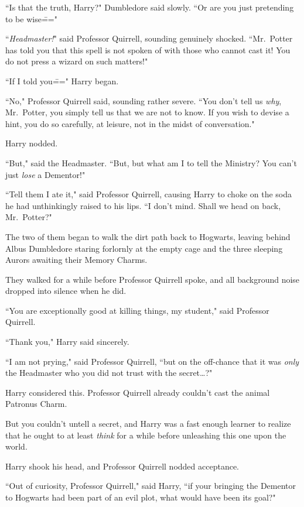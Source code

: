 ``Is that the truth, Harry?" Dumbledore said slowly. ``Or are you just pretending to be wise\==="

``\emph{Headmaster!}" said Professor Quirrell, sounding genuinely shocked. ``Mr.~Potter has told you that this spell is not spoken of with those who cannot cast it! You do not press a wizard on such matters!"

``If I told you\===" Harry began.

``No," Professor Quirrell said, sounding rather severe. ``You don't tell us \emph{why}, Mr.~Potter, you simply tell us that we are not to know. If you wish to devise a hint, you do so carefully, at leisure, not in the midst of conversation."

Harry nodded.

``But," said the Headmaster. ``But, but what am I to tell the Ministry? You can't just \emph{lose} a Dementor!"

``Tell them I ate it," said Professor Quirrell, causing Harry to choke on the soda he had unthinkingly raised to his lips. ``I don't mind. Shall we head on back, Mr.~Potter?"

The two of them began to walk the dirt path back to Hogwarts, leaving behind Albus Dumbledore staring forlornly at the empty cage and the three sleeping Aurors awaiting their Memory Charms.


They walked for a while before Professor Quirrell spoke, and all background noise dropped into silence when he did.

``You are exceptionally good at killing things, my student," said Professor Quirrell.

``Thank you," Harry said sincerely.

``I am not prying," said Professor Quirrell, ``but on the off-chance that it was \emph{only} the Headmaster who you did not trust with the secret{\ldots}?"

Harry considered this. Professor Quirrell already couldn't cast the animal Patronus Charm.

But you couldn't untell a secret, and Harry was a fast enough learner to realize that he ought to at least \emph{think} for a while before unleashing this one upon the world.

Harry shook his head, and Professor Quirrell nodded acceptance.

``Out of curiosity, Professor Quirrell," said Harry, ``if your bringing the Dementor to Hogwarts had been part of an evil plot, what would have been its goal?"

